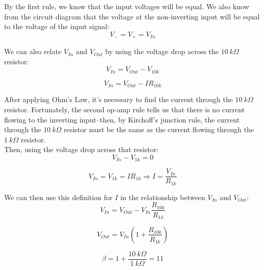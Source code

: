 \documentclass[11pt]{article}
\begin{document}
By the first rule, we know that the input voltages will be equal. We also know from the circuit diagram that the voltage at the non-inverting input will be equal to the voltage of the input signal:\\

\begin{equation}
    V_{-} = V_{+} = V_{In}
\end{equation}

We can also relate $V_{In}$ and $V_{Out}$ by using the voltage drop across the $10\ k \Omega$ resistor:\\

\begin{equation}
    V_{In} = V_{Out} - V_{10k}
\end{equation}

\begin{equation}
    V_{In} = V_{Out} - I R_{10k}
\end{equation}

After applying Ohm's Law, it's necessary to find the current through the $10\ k \Omega$ resistor. Fortunately, the second op-amp rule tells us that there is no current flowing to the inverting input--then, by Kirchoff's junction rule, the current through the $10\ k \Omega$ resistor must be the same as the current flowing through the $1\ k \Omega$ resistor. \\

Then, using the voltage drop across that resistor:\\

\begin{equation}
    V_{In} - V_{1k} = 0
\end{equation}

\begin{equation}
    V_{In} = V_{1k} = I R_{1k} \Longrightarrow I = \frac{V_{In}}{R_{1k}}
\end{equation}

We can then use this definition for $I$ in the relationship between $V_{In}$ and $V_{Out}$:\\

\begin{equation}
    V_{In} = V_{Out} - V_{In} \frac{R_{10k}}{R_{1k}}
\end{equation}

\begin{equation}
    V_{Out} = V_{In} (1 + \frac{R_{10k}}{R_{1k}})
\end{equation}

\begin{equation}
    \beta = 1 + \frac{10\ k \Omega}{1\ k \Omega} = 11
\end{equation}
\end{document}
